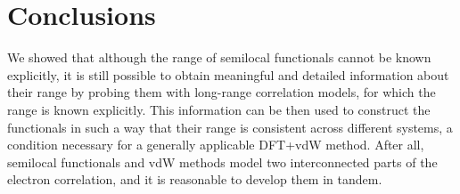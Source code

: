 \section{Conclusions}

We showed that although the range of semilocal functionals cannot be known explicitly, it is still possible to obtain meaningful and detailed information about their range by probing them with long-range correlation models, for which the range is known explicitly.
This information can be then used to construct the functionals in such a way that their range is consistent across different systems, a condition necessary for a generally applicable DFT+vdW method.
After all, semilocal functionals and vdW methods model two interconnected parts of the electron correlation, and it is reasonable to develop them in tandem.
